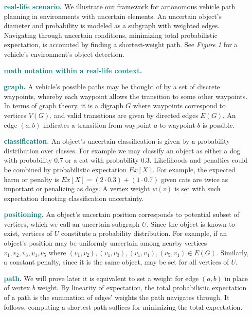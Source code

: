 \textcolor{teal}{\textbf{real-life scenario.}} We illustrate our framework for autonomous vehicle path planning in environments with uncertain elements. An uncertain object's diameter and probability is modeled as a subgraph with weighted edges. Navigating through uncertain conditions, minimizing total probabilistic expectation, is accounted by finding a shortest-weight path. See \textit{Figure 1} for a vehicle's environment's object detection.

\textcolor{teal}{\textbf{math notation within a real-life context.}}

\textcolor{teal}{\textbf{graph.}} A vehicle's possible paths may be thought of by a set of discrete waypoints, whereby each waypoint allows the transition to some other waypoints. In terms of graph theory, it is a digraph $G$ where waypoints correspond to vertices $V(G)$, and valid transitions are given by directed edges $E(G)$. An edge $(a,b)$ indicates a transition from waypoint $a$ to waypoint $b$ is possible.

\textcolor{teal}{\textbf{classification.}} An object's uncertain classification is given by a probability distribution over classes. For example we may classify an object as either a dog with probability 0.7 or a cat with probability 0.3. Likelihoods and penalties could be combined by probabilistic expectation $Ex[X]$. For example, the expected harm or penalty is $Ex[X] = (2 \cdot 0.3) + (1 \cdot 0.7)$ given cats are twice as important or penalizing as dogs. A vertex weight $w(v)$ is set with such expectation denoting classification uncertainty.

\textcolor{teal}{\textbf{positioning.}} An object's uncertain position corresponds to potential subset of vertices, which we call an uncertain subgraph $U$. Since the object is known to exist, vertices of $U$ constitute a probability distribution. For example, if an object's position may be uniformly uncertain among nearby vertices $v_1, v_2, v_3, v_4, v_5$ where $(v_1,v_2), (v_1, v_3), (v_1, v_4), (v_5,v_1) \in E(G)$. Similarly, a constant penalty, since it is the same object, may be set for all vertices of $U$.

\textcolor{teal}{\textbf{path.}} We will prove later it is equivalent to set a weight for edge $(a,b)$ in place of vertex $b$ weight. By linearity of expectation, the total probabilistic expectation of a path is the summation of edges' weights the path navigates through. It follows, computing a shortest path suffices for minimizing the total expectation.

